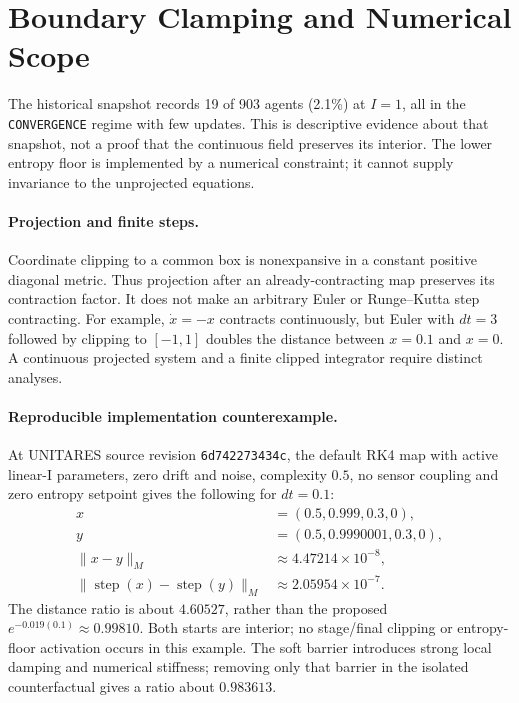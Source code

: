\documentclass[11pt,twocolumn]{article}
\begin{document}
\section{Boundary Clamping and Numerical Scope}
\label{app:boundary-clamping}

The historical snapshot records 19 of 903 agents (2.1\%) at
$I=1$, all in the \texttt{CONVERGENCE} regime with few updates.
This is descriptive evidence about that snapshot, not a proof
that the continuous field preserves its interior. The lower
entropy floor is implemented by a numerical constraint; it
cannot supply invariance to the unprojected equations.

\paragraph{Projection and finite steps.}
Coordinate clipping to a common box is nonexpansive in a
constant positive diagonal metric. Thus projection after an
already-contracting map preserves its contraction factor.
It does not make an arbitrary Euler or Runge--Kutta step
contracting. For example, $\dot x=-x$ contracts continuously,
but Euler with $dt=3$ followed by clipping to $[-1,1]$ doubles
the distance between $x=0.1$ and $x=0$. A continuous projected
system and a finite clipped integrator require distinct analyses.

\paragraph{Reproducible implementation counterexample.}
At UNITARES source revision \texttt{6d742273434c}, the default
RK4 map with active linear-I parameters, zero drift and noise,
complexity $0.5$, no sensor coupling and zero entropy setpoint
gives the following for $dt=0.1$:
\begin{align*}
 x&=(0.5,0.999,0.3,0),\\
 y&=(0.5,0.9990001,0.3,0),\\
 \|x-y\|_M&\approx4.47214\times10^{-8},\\
 \|\operatorname{step}(x)-\operatorname{step}(y)\|_M
   &\approx2.05954\times10^{-7}.
\end{align*}
The distance ratio is about $4.60527$, rather than the proposed
$e^{-0.019(0.1)}\approx0.99810$. Both starts are interior;
no stage/final clipping or entropy-floor activation occurs in
this example. The soft barrier introduces strong local damping
and numerical stiffness; removing only that barrier in the
isolated counterfactual gives a ratio about $0.983613$.
\end{document}
